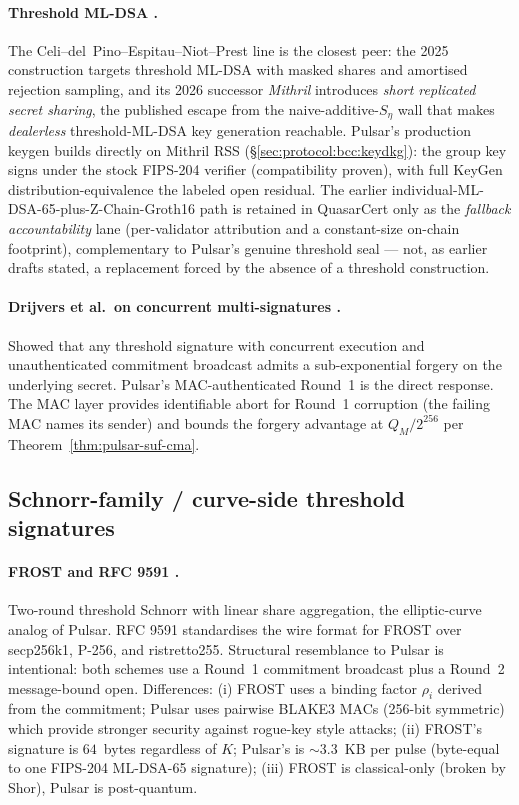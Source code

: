 \paragraph{Threshold ML-DSA {\cite{tmldsa2025,mithril2026}}.} The
Celi--del~Pino--Espitau--Niot--Prest line is the closest peer: the 2025
construction \cite{tmldsa2025} targets threshold ML-DSA with masked
shares and amortised rejection sampling, and its 2026 successor
\emph{Mithril} \cite{mithril2026} introduces \emph{short replicated
secret sharing}, the published escape from the naive-additive-$S_\eta$
wall that makes \emph{dealerless} threshold-ML-DSA key generation
reachable. Pulsar's production keygen builds directly on Mithril RSS
(\S\ref{sec:protocol:bcc:keydkg}): the group key signs under the stock
FIPS-204 verifier (compatibility proven), with full KeyGen
distribution-equivalence the labeled open residual. The earlier
individual-ML-DSA-65-plus-Z-Chain-Groth16 path is retained in QuasarCert
only as the \emph{fallback accountability} lane (per-validator
attribution and a constant-size on-chain footprint), complementary to
Pulsar's genuine threshold seal --- not, as earlier drafts stated, a
replacement forced by the absence of a threshold construction.

\paragraph{Drijvers et al.\ on concurrent multi-signatures
\cite{drijvers2019}.} Showed that any threshold signature with
concurrent execution and unauthenticated commitment broadcast admits
a sub-exponential forgery on the underlying secret. Pulsar's
MAC-authenticated Round~1 is the direct response. The MAC layer
provides identifiable abort for Round~1 corruption (the failing MAC
names its sender) and bounds the forgery advantage at
$Q_M / 2^{256}$ per Theorem~\ref{thm:pulsar-suf-cma}.

\subsection{Schnorr-family / curve-side threshold signatures}
\label{sec:related:schnorr}

\paragraph{FROST \cite{frost,komlogoldberg20} and RFC 9591
\cite{rfc9591}.} Two-round threshold Schnorr with linear share
aggregation, the elliptic-curve analog of Pulsar. RFC 9591
standardises the wire format for FROST over secp256k1, P-256, and
ristretto255. Structural resemblance to Pulsar is intentional: both
schemes use a Round~1 commitment broadcast plus a Round~2
message-bound open. Differences: (i) FROST uses a binding factor
$\rho_i$ derived from the commitment; Pulsar uses pairwise BLAKE3
MACs (256-bit symmetric) which provide stronger security against
rogue-key style attacks; (ii) FROST's signature is $64$~bytes
regardless of $K$; Pulsar's is $\sim 3.3$~KB per pulse (byte-equal to one
FIPS-204 ML-DSA-65 signature); (iii) FROST is
classical-only (broken by Shor), Pulsar is post-quantum.


